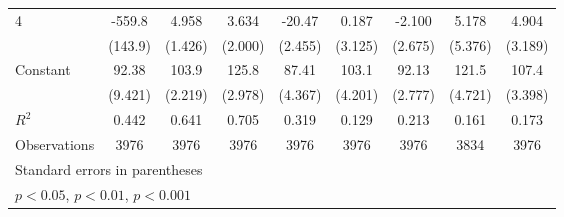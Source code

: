 \documentclass{article}
\begin{document}
{\begin{longtable}{l*{8}{c}}
4               &   -559.8\sym{***}&    4.958\sym{**} &    3.634         &   -20.47\sym{***}&    0.187         &   -2.100         &    5.178         &    4.904         \\
                &  (143.9)         &  (1.426)         &  (2.000)         &  (2.455)         &  (3.125)         &  (2.675)         &  (5.376)         &  (3.189)         \\
Constant        &    92.38\sym{***}&    103.9\sym{***}&    125.8\sym{***}&    87.41\sym{***}&    103.1\sym{***}&    92.13\sym{***}&    121.5\sym{***}&    107.4\sym{***}\\
                &  (9.421)         &  (2.219)         &  (2.978)         &  (4.367)         &  (4.201)         &  (2.777)         &  (4.721)         &  (3.398)         \\
\hline
\(R^{2}\)       &    0.442         &    0.641         &    0.705         &    0.319         &    0.129         &    0.213         &    0.161         &    0.173         \\
Observations    &     3976         &     3976         &     3976         &     3976         &     3976         &     3976         &     3834         &     3976         \\
\hline\hline
\multicolumn{9}{l}{\footnotesize Standard errors in parentheses}\\
\multicolumn{9}{l}{\footnotesize \sym{*} \(p<0.05\), \sym{**} \(p<0.01\), \sym{***} \(p<0.001\)}\\
\end{longtable}
}
\end{document}
